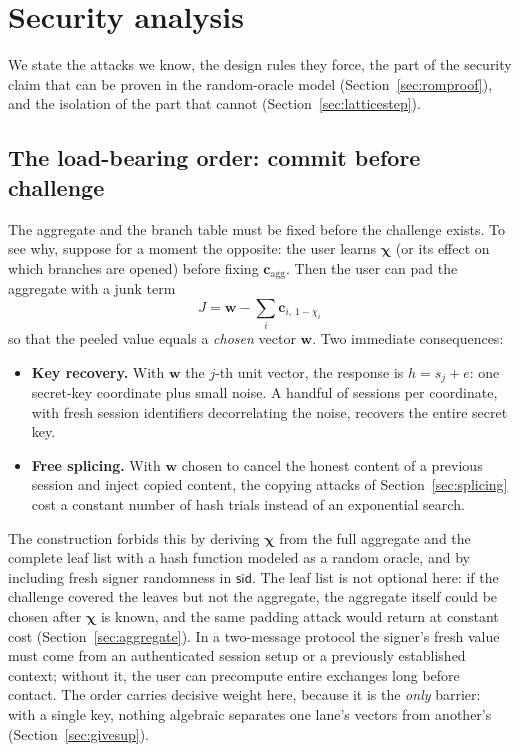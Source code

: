 \documentclass[11pt]{article}
\begin{document}
\section{Security analysis}
\label{sec:intuition}

We state the attacks we know, the design rules they force, the part of the
security claim that can be proven in the random-oracle model
(Section~\ref{sec:romproof}), and the isolation of the part that cannot
(Section~\ref{sec:latticestep}).

\subsection{The load-bearing order: commit before challenge}
\label{sec:order}

The aggregate and the branch table must be fixed before the challenge exists.
To see why, suppose for a moment the opposite: the user learns
$\boldsymbol\chi$ (or its effect on which branches are opened) before fixing
$\mathbf c_{\mathrm{agg}}$.  Then the user can pad the aggregate with a junk
term
\[
 J=\mathbf w-\sum_i \mathbf c_{i,\,1-\chi_i}
\]
so that the peeled value equals a \emph{chosen} vector $\mathbf w$.  Two
immediate consequences:

\begin{itemize}
 \item \textbf{Key recovery.}  With $\mathbf w$ the $j$-th unit vector, the
response is $h=s_j+e$: one secret-key coordinate plus small noise.  A handful
of sessions per coordinate, with fresh session identifiers decorrelating the
noise, recovers the entire secret key.
 \item \textbf{Free splicing.}  With $\mathbf w$ chosen to cancel the honest
content of a previous session and inject copied content, the copying attacks
of Section~\ref{sec:splicing} cost a constant number of hash trials instead of
an exponential search.
\end{itemize}

The construction forbids this by deriving $\boldsymbol\chi$ from the full
aggregate and the complete leaf list with a hash function modeled as a random
oracle, and by including fresh signer randomness in $\mathsf{sid}$.  The leaf
list is not optional here: if the challenge covered the leaves but not the
aggregate, the aggregate itself could be chosen after $\boldsymbol\chi$ is
known, and the same padding attack would return at constant cost
(Section~\ref{sec:aggregate}).  In a two-message protocol the
signer's fresh value must come from an authenticated session setup or a
previously established context; without it, the user can precompute entire
exchanges long before contact.  The order carries decisive weight here,
because it is the \emph{only} barrier: with a single key, nothing algebraic
separates one lane's vectors from another's (Section~\ref{sec:givesup}).
\end{document}
